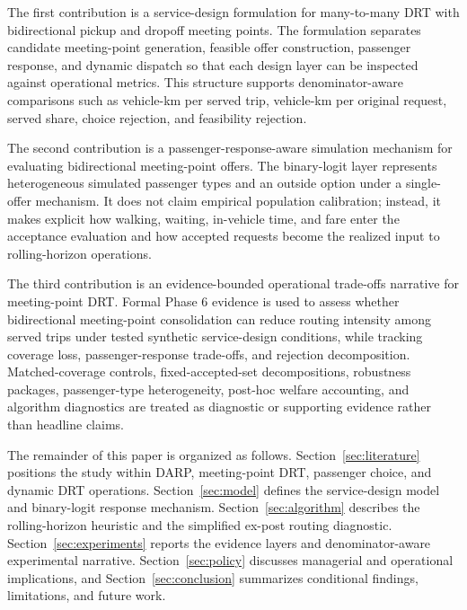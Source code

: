 The first contribution is a service-design formulation for many-to-many DRT with
bidirectional pickup and dropoff meeting points. The formulation separates candidate
meeting-point generation, feasible offer construction, passenger response, and dynamic
dispatch so that each design layer can be inspected against operational metrics. This
structure supports denominator-aware comparisons such as vehicle-km per served trip,
vehicle-km per original request, served share, choice rejection, and feasibility
rejection.

The second contribution is a passenger-response-aware simulation mechanism for
evaluating bidirectional meeting-point offers. The binary-logit layer represents
heterogeneous simulated passenger types and an outside option under a single-offer
mechanism. It does not claim empirical population calibration; instead, it makes explicit
how walking, waiting, in-vehicle time, and fare enter the acceptance evaluation and how
accepted requests become the realized input to rolling-horizon operations.

The third contribution is an evidence-bounded operational trade-offs narrative for
meeting-point DRT. Formal Phase 6 evidence is used to assess whether bidirectional
meeting-point consolidation can reduce routing intensity among served trips under tested
synthetic service-design conditions, while tracking coverage loss, passenger-response
trade-offs, and rejection decomposition. Matched-coverage controls,
fixed-accepted-set decompositions, robustness packages, passenger-type heterogeneity,
post-hoc welfare accounting, and algorithm diagnostics are treated as diagnostic or
supporting evidence rather than headline claims.

The remainder of this paper is organized as follows. Section~\ref{sec:literature}
positions the study within DARP, meeting-point DRT, passenger choice, and dynamic DRT
operations. Section~\ref{sec:model} defines the service-design model and binary-logit
response mechanism. Section~\ref{sec:algorithm} describes the rolling-horizon heuristic
and the simplified ex-post routing diagnostic. Section~\ref{sec:experiments} reports the
evidence layers and denominator-aware experimental narrative. Section~\ref{sec:policy}
discusses managerial and operational implications, and Section~\ref{sec:conclusion}
summarizes conditional findings, limitations, and future work.
